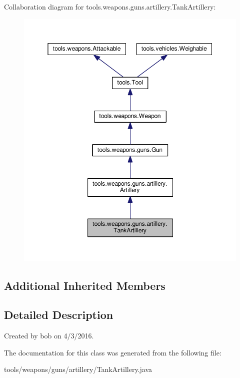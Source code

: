 Collaboration diagram for tools.\+weapons.\+guns.\+artillery.\+Tank\+Artillery\+:
\nopagebreak
\begin{figure}[H]
\begin{center}
\leavevmode
\includegraphics[width=350pt]{classtools_1_1weapons_1_1guns_1_1artillery_1_1_tank_artillery__coll__graph}
\end{center}
\end{figure}
\subsection*{Additional Inherited Members}


\subsection{Detailed Description}
Created by bob on 4/3/2016. 

The documentation for this class was generated from the following file\+:\begin{DoxyCompactItemize}
\item 
tools/weapons/guns/artillery/Tank\+Artillery.\+java\end{DoxyCompactItemize}
